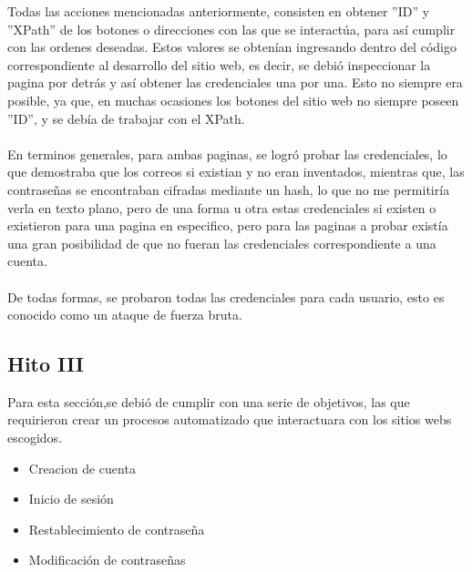 \documentclass{article}
\begin{document}
Todas las acciones mencionadas anteriormente, consisten en obtener ''ID'' y ''XPath'' de los botones o direcciones con las que se
interactúa, para así cumplir con las ordenes deseadas. Estos valores se obtenían ingresando dentro del código correspondiente al desarrollo
del sitio web, es decir, se debió inspeccionar la pagina por detrás y así obtener las credenciales una por una. Esto no siempre era posible, ya que, en muchas
ocasiones los botones del sitio web no siempre poseen ''ID'', y se debía de trabajar con el XPath.
\\\\
En terminos generales, para ambas paginas, se logró probar las credenciales, lo que demostraba que los correos si existian y no eran inventados, 
mientras que, las contraseñas se encontraban cifradas mediante un hash, lo que no me permitiría verla en texto plano, pero de una forma u otra
estas credenciales si existen o existieron para una pagina en especifico, pero para las paginas a probar existía una gran posibilidad de que
no fueran las credenciales correspondiente a una cuenta. 
\\\\
De todas formas, se probaron todas las credenciales para cada usuario, esto es conocido como un ataque de fuerza bruta.

\newpage
\subsection{Hito III}
Para esta sección,se debió de cumplir con una serie de objetivos, las que requirieron crear un procesos automatizado que 
interactuara con los sitios webs escogidos. 
\begin{itemize}
    \item Creacion de cuenta
    \item Inicio de sesión
    \item Restablecimiento de contraseña
    \item Modificación de contraseñas
\end{itemize}
\end{document}
